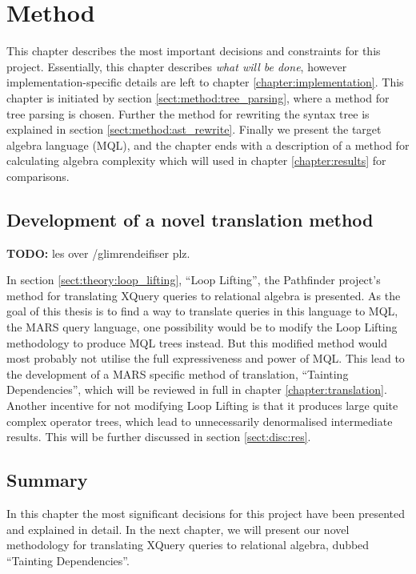 \chapter{Method}
\label{chapter:method}
This chapter describes the most important decisions and constraints for this
project. Essentially, this chapter describes \emph{what will be done}, however
implementation-specific details are left to chapter
\ref{chapter:implementation}. This chapter is initiated by section
\ref{sect:method:tree_parsing}, where a method for tree parsing is chosen.
Further the method for rewriting the syntax tree is explained in section
\ref{sect:method:ast_rewrite}. Finally we present the target algebra language
(MQL), and the chapter ends with a description of a method for calculating
algebra complexity which will used in chapter \ref{chapter:results} for
comparisons.

\section{Development of a novel translation method}
\textbf{\LARGE TODO:} les over /glimrendeifiser plz.

In section \ref{sect:theory:loop_lifting}, ``Loop Lifting'', the Pathfinder project's method for translating XQuery
queries to relational algebra is presented. As the goal of this thesis is to
find a way to translate queries in this language to MQL, the MARS query language, one possibility would be to modify the Loop Lifting
methodology to produce MQL trees instead. But this modified method would most probably not utilise the full
expressiveness and power of MQL. This lead to the development of a MARS specific method of translation, ``Tainting
Dependencies'', which will be reviewed in full in chapter \ref{chapter:translation}. Another incentive for not
modifying Loop Lifting is that it produces large quite complex operator trees, which lead to unnecessarily
denormalised intermediate results. This will be further discussed in section \ref{sect:disc:res}.








\section{Summary}
\label{sect:method:summary}
In this chapter the most significant decisions for this project have been
presented and explained in detail. In the next chapter, we will present our
novel methodology for translating XQuery queries to relational algebra, dubbed
``Tainting Dependencies''.
